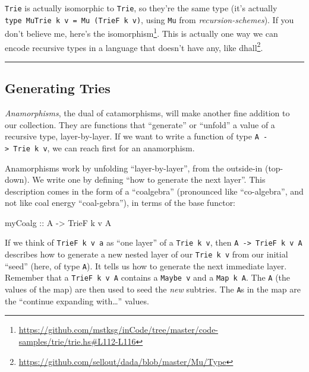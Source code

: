 \documentclass[]{article}
\newenvironment{Shaded}{}{}
\newcommand{\DataTypeTok}[1]{\textcolor[rgb]{0.56,0.13,0.00}{#1}}
\newcommand{\NormalTok}[1]{#1}
\newcommand{\OtherTok}[1]{\textcolor[rgb]{0.00,0.44,0.13}{#1}}
\renewcommand{\href}[2]{#2\footnote{\url{#1}}}
\begin{document}
\texttt{Trie\textquotesingle{}} is actually isomorphic to \texttt{Trie}, so
they're the same type (it's actually
\texttt{type\ MuTrie\ k\ v\ =\ Mu\ (TrieF\ k\ v)}, using \texttt{Mu} from
\emph{recursion-schemes}). If you don't believe me,
\href{https://github.com/mstksg/inCode/tree/master/code-samples/trie/trie.hs\#L112-L116}{here's
the isomorphism}. This is actually one way we can encode recursive types in a
language that doesn't have any, like
\href{https://github.com/sellout/dada/blob/master/Mu/Type}{dhall}.

\begin{center}\rule{0.5\linewidth}{0.5pt}\end{center}

\subsection{Generating Tries}\label{generating-tries}

\emph{Anamorphisms}, the dual of catamorphisms, will make another fine addition
to our collection. They are functions that ``generate'' or ``unfold'' a value of
a recursive type, layer-by-layer. If we want to write a function of type
\texttt{A\ -\textgreater{}\ Trie\ k\ v}, we can reach first for an anamorphism.

Anamorphisms work by unfolding ``layer-by-layer'', from the outside-in
(top-down). We write one by defining ``how to generate the next layer''. This
description comes in the form of a ``coalgebra'' (pronounced like
``co-algebra'', and not like coal energy ``coal-gebra''), in terms of the base
functor:

\begin{Shaded}
\begin{Highlighting}[]
\OtherTok{myCoalg ::} \DataTypeTok{A} \OtherTok{{-}\textgreater{}} \DataTypeTok{TrieF}\NormalTok{ k v }\DataTypeTok{A}
\end{Highlighting}
\end{Shaded}

If we think of \texttt{TrieF\ k\ v\ a} as ``one layer'' of a
\texttt{Trie\ k\ v}, then \texttt{A\ -\textgreater{}\ TrieF\ k\ v\ A} describes
how to generate a new nested layer of our \texttt{Trie\ k\ v} from our initial
``seed'' (here, of type \texttt{A}). It tells us how to generate the next
immediate layer. Remember that a \texttt{TrieF\ k\ v\ A} contains a
\texttt{Maybe\ v} and a \texttt{Map\ k\ A}. The \texttt{A} (the values of the
map) are then used to seed the \emph{new} subtries. The \texttt{A}s in the map
are the ``continue expanding with\ldots{}'' values.
\end{document}
